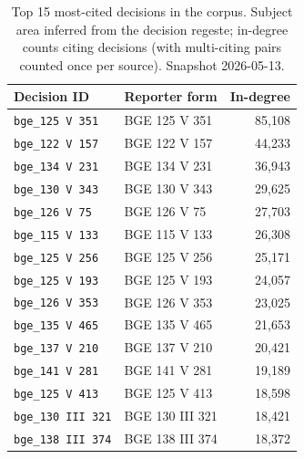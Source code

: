 \begin{table}[t]
\centering
\caption{Top 15 most-cited decisions in the corpus. Subject area inferred from the decision regeste; in-degree counts citing decisions (with multi-citing pairs counted once per source). Snapshot 2026-05-13.}
\label{tab:top_cited}
\small
\begin{tabular}{l l r}
\toprule
\textbf{Decision ID} & \textbf{Reporter form} & \textbf{In-degree} \\
\midrule
\texttt{bge\_125 V 351} & BGE 125 V 351 & 85,108 \\
\texttt{bge\_122 V 157} & BGE 122 V 157 & 44,233 \\
\texttt{bge\_134 V 231} & BGE 134 V 231 & 36,943 \\
\texttt{bge\_130 V 343} & BGE 130 V 343 & 29,625 \\
\texttt{bge\_126 V 75} & BGE 126 V 75 & 27,703 \\
\texttt{bge\_115 V 133} & BGE 115 V 133 & 26,308 \\
\texttt{bge\_125 V 256} & BGE 125 V 256 & 25,171 \\
\texttt{bge\_125 V 193} & BGE 125 V 193 & 24,057 \\
\texttt{bge\_126 V 353} & BGE 126 V 353 & 23,025 \\
\texttt{bge\_135 V 465} & BGE 135 V 465 & 21,653 \\
\texttt{bge\_137 V 210} & BGE 137 V 210 & 20,421 \\
\texttt{bge\_141 V 281} & BGE 141 V 281 & 19,189 \\
\texttt{bge\_125 V 413} & BGE 125 V 413 & 18,598 \\
\texttt{bge\_130 III 321} & BGE 130 III 321 & 18,421 \\
\texttt{bge\_138 III 374} & BGE 138 III 374 & 18,372 \\
\bottomrule
\end{tabular}
\end{table}
